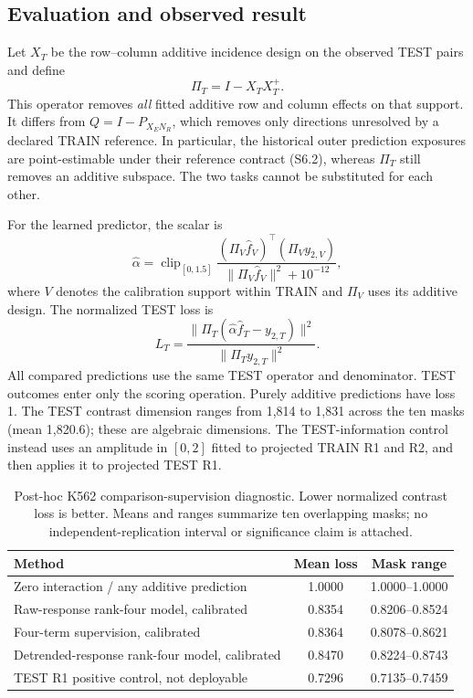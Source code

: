 \documentclass[11pt]{article}
\begin{document}
\subsection{Evaluation and observed result}
Let $X_T$ be the row--column additive incidence design on the observed TEST pairs and define
\[
 \Pi_T=I-X_TX_T^+.
\]
This operator removes \emph{all} fitted additive row and column effects on that support. It differs from $Q=I-P_{X_EN_R}$, which removes only directions unresolved by a declared TRAIN reference. In particular, the historical outer prediction exposures are point-estimable under their reference contract (S6.2), whereas $\Pi_T$ still removes an additive subspace. The two tasks cannot be substituted for each other.

For the learned predictor, the scalar is
\[
 \widehat\alpha=\operatorname{clip}_{[0,1.5]}
 \frac{(\Pi_V\widehat f_V)^\top(\Pi_Vy_{2,V})}
 {\|\Pi_V\widehat f_V\|^2+10^{-12}},
\]
where $V$ denotes the calibration support within TRAIN and $\Pi_V$ uses its additive design. The normalized TEST loss is
\[
 L_T=\frac{\|\Pi_T(\widehat\alpha\widehat f_T-y_{2,T})\|^2}
 {\|\Pi_Ty_{2,T}\|^2}.
\]
All compared predictions use the same TEST operator and denominator. TEST outcomes enter only the scoring operation. Purely additive predictions have loss 1. The TEST contrast dimension ranges from 1,814 to 1,831 across the ten masks (mean 1,820.6); these are algebraic dimensions. The TEST-information control instead uses an amplitude in $[0,2]$ fitted to projected TRAIN R1 and R2, and then applies it to projected TEST R1.

\begin{table}[htbp]
\centering\small
\caption{Post-hoc K562 comparison-supervision diagnostic. Lower normalized contrast loss is better. Means and ranges summarize ten overlapping masks; no independent-replication interval or significance claim is attached.}
\label{tab:posthoccomparison}
\begin{tabularx}{\textwidth}{@{}Xcc@{}}
\toprule
Method & Mean loss & Mask range\\\midrule
Zero interaction / any additive prediction & 1.0000 & 1.0000--1.0000\\
Raw-response rank-four model, calibrated & 0.8354 & 0.8206--0.8524\\
Four-term supervision, calibrated & 0.8364 & 0.8078--0.8621\\
Detrended-response rank-four model, calibrated & 0.8470 & 0.8224--0.8743\\
TEST R1 positive control, not deployable & 0.7296 & 0.7135--0.7459\\\bottomrule
\end{tabularx}
\end{table}
\end{document}
